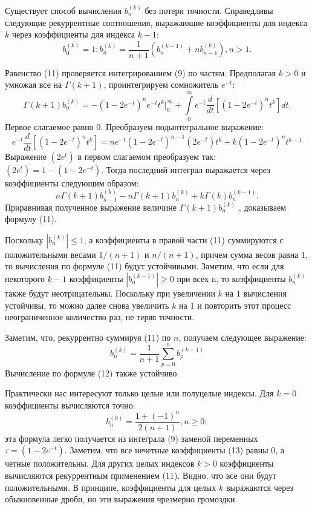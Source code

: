 Существует способ вычисления $b_n^{(k)}$ без потери точности. Справедливы
следующие рекуррентные соотношения, выражающие коэффициенты для
индекса $k$ через коэффициенты для индекса $k-1$:
\begin{equation}
b_0^{(k)}=1;b_n^{(k)}=\frac{1}{n+1}(b_n^{(k-1)}+nb_{n-1}^{(k)}),n>1.
\end{equation}

Равенство (11) проверяется интегрированием (9) по частям. Предполагая
$k > 0$ и умножая все на $\Gamma(k + 1)$, проинтегрируем сомножитель $e^{-t}$:
\begin{equation}
\Gamma(k+1)b_n^{(k)}=-(1-2e^{-t})^ne^{-t}t^k\Big|_0^{\infty} + \int\limits_0^{\infty} e^{-t}\frac{d}{dt}[(1-2e^{-t})^nt^k]dt. 
\end{equation}
Первое слагаемое равно 0. Преобразуем подынтегральное выражение:
\begin{equation}
 e^{-t}\frac{d}{dt}[(1-2e^{-t})^nt^k]=ne^{-t}(1-2e^{-t})^{n-1}(2e^{-t})t^k+k(1-2e^{-t})^nt^{k-1}
\end{equation}
Выражение $(2e^{t})$  в первом слагаемом преобразуем так: $(2e^{t})= 1-(1-2e^{-t})$.
Тогда последний интеграл выражается через коэффициенты следующим
образом:
\begin{equation}
n\Gamma(k+1)b_{n-1}^{(k)}-n\Gamma(k+1)b_n^{(k)}+k\Gamma(k)b_n^{(k-1)}.
\end{equation}
Приравнивая полученное выражение величине $\Gamma{(k+1)}b_n^{(k)}$ , доказываем формулу (11).

Поскольку $|b_n^{(k)}| \leqslant 1$, а коэффициенты в правой части (11) суммируются с
положительными весами $1/(n + 1)$ и $n/(n + 1)$, причем сумма весов равна 1, то
вычисления по формуле (11) будут устойчивыми. Заметим, что если для
некоторого $k - 1$ коэффициенты $|b_n^{(k-1)}| \geqslant 0$ при всех n, то коэффициенты $b_n^{(k)}$ также будут неотрицательны. Поскольку при увеличении $k$ на 1 вычисления
устойчивы, то можно далее снова увеличить $k$ на 1 и повторить этот процесс
неограниченное количество раз, не теряя точности.

Заметим, что, рекуррентно суммируя (11) по $n$, получаем следующее выражение:
\begin{equation}
b_n^{(k)}=\frac{1}{n+1}\sum\limits_{p=0}^n b_p^{(k-1)}
\end{equation}
Вычисление по формуле (12) также устойчиво.

Практически нас интересуют только целые или полуцелые индексы. Для
$k = 0$ коэффициенты вычисляются точно:
\begin{equation}
b_n^{(0)}=\frac{1+(-1)^n}{2(n+1)},n \geqslant 0;
\end{equation}
эта формула легко получается из интеграла (9) заменой переменных
$\tau = (1 - 2e^{-t})$. Заметим, что все нечетные коэффициенты (13) равны 0, а четные
положительны. Для других целых индексов $k > 0$ коэффициенты вычисляются
рекуррентным применением (11). Видно, что все они будут положительными. В
принципе, коэффициенты для целых $k$ выражаются через обыкновенные дроби,
но эти выражения чрезмерно громоздки.

